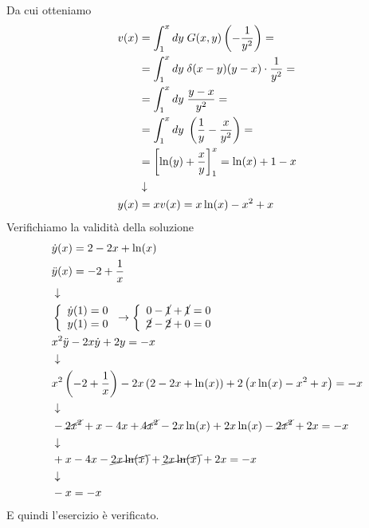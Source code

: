 Da cui otteniamo
\begin{align}
	v(x) &= \int_{1}^x dy \;G(x,y) \left(-\frac{1}{y^2}\right) = \nonumber \\
		 &= \int_{1}^x dy \; \delta (x-y) (y-x) \cdot \frac{1}{y^2}= \nonumber \\
		 &= \int_{1}^x dy \; \frac{y-x}{y^2}= \nonumber \\
		 &= \int_{1}^x dy \; \left(\frac{1}{y} - \frac{x}{y^2}\right)= \nonumber \\
		 &= \left[ \ln(y) + \frac{x}{y} \right]_1^x = \ln(x) +1 -x \nonumber \\ &\downarrow \nonumber \\
	y(x) &= xv(x) = x\ln(x) - x^2 +x
\end{align}
Verifichiamo la validità della soluzione
\begin{align}
	&\dot{y}(x) = 2 - 2x + \ln(x)\\
	&\ddot{y}(x) = -2 + \frac{1}{x} \\ &\downarrow \nonumber \\
	&\left\{ \begin{array}{cc} \dot{y}(1) = 0\\ y(1) = 0 \end{array} \right. \to \left\{ \begin{array}{cc} 0 -\cancel{1} +\cancel{1} =0\\ \cancel{2}-\cancel{2} + 0 =0 \end{array} \right.\\
	&x^2 \ddot{y} - 2x \dot{y} + 2y = -x \\ &\downarrow \nonumber \\
	&x^2 \left( -2 + \frac{1}{x} \right) -2x \left( 2 - 2x + \ln(x) \right) + 2 \left( x\ln(x) - x^2 +x \right) = -x \nonumber \\ &\downarrow \nonumber \\
	& -\cancel{2x^2} + x - 4x + \cancel{4x^2} - 2x\ln(x) + 2x\ln(x) -\cancel{2x^2} +2x = -x \nonumber \\ &\downarrow \nonumber \\
	& + x - 4x - \cancel{2x\ln(x)} + \cancel{2x\ln(x)} +2x = -x \nonumber \\ &\downarrow \nonumber \\
	& -x = -x
\end{align}
E quindi l'esercizio è verificato.

\newpage

